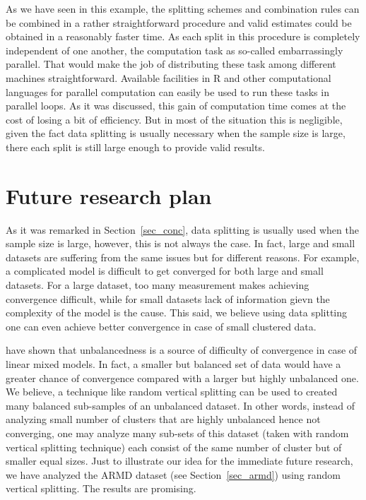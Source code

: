 \documentclass[11pt,a5paper,twoside]{book}
\begin{document}
As we have seen in this example, the splitting schemes and combination rules can be combined in a rather straightforward procedure and valid estimates could be obtained in a reasonably faster time. As each split in this procedure is completely independent of one another, the computation task as so-called embarrassingly parallel. That would make the job of distributing these task among different machines straightforward. Available facilities in R and other computational languages for parallel computation can easily be used to run these tasks in parallel loops. As it was discussed, this gain of computation time comes at the cost of losing a bit of efficiency. But in most of the situation this is negligible, given the fact data splitting is usually necessary when the sample size is large, there each split is still large enough to provide valid results.  





\section{Future research plan}
\label{sec_future}

As it was remarked in Section~\ref{sec_conc}, data splitting is usually used when the sample size is large, however, this is not always the case. In fact, large and small datasets are suffering from the same issues but for different reasons. For example, a complicated model is difficult to get converged for both large and small datasets. For a large dataset, too many measurement makes achieving convergence difficult, while for small datasets lack of information gievn the complexity of the model is the cause. This said, we believe using data splitting one can even achieve better convergence in case of small clustered data.

\cite{wim2015} have shown that unbalancedness is a source of difficulty of convergence in case of linear mixed models. In fact, a smaller but balanced set of data would have a greater chance of convergence compared with a larger but highly unbalanced one. We believe, a technique like random vertical splitting can be used to created many balanced sub-samples of an unbalanced dataset. In other words, instead of analyzing small number of clusters that are highly unbalanced hence not converging, one may analyze many sub-sets of this dataset (taken with random vertical splitting technique) each consist of the same number of cluster but of smaller equal sizes. Just to illustrate our idea for the immediate future research, we have analyzed the ARMD dataset (see Section~\ref{sec_armd}) using random vertical splitting. The results are promising.
\end{document}

